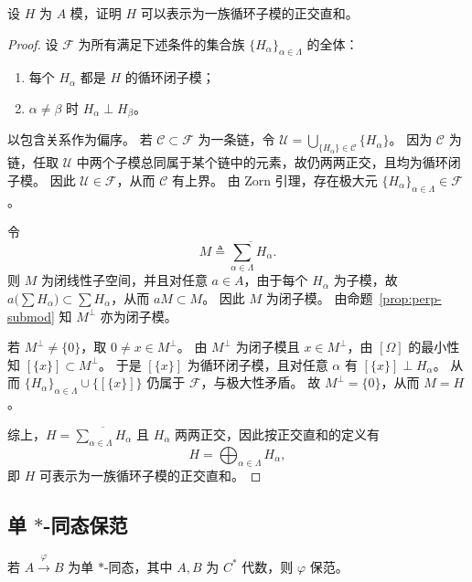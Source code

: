 \documentclass[lang=cn,a4paper,newtx,section]{elegantbook}
\begin{document}
  \begin{exercise}\label{exer:cyclic-decomp}
    设 $H$ 为 $A$ 模，证明 $H$ 可以表示为一族循环子模的正交直和。
    \begin{proof}
      设 $\mathcal{F}$ 为所有满足下述条件的集合族 $\{H_\alpha\}_{\alpha\in\Lambda}$ 的全体：
      
      \begin{enumerate}
        \item 每个 $H_\alpha$ 都是 $H$ 的循环闭子模；
        \item $\alpha\ne\beta$ 时 $H_\alpha\perp H_\beta$。
      \end{enumerate}
      以包含关系作为偏序。
      若 $\mathcal{C}\subset\mathcal{F}$ 为一条链，令 $\mathcal{U}=\bigcup_{\{H_\alpha\}\in\mathcal{C}}\{H_\alpha\}$。
      因为 $\mathcal{C}$ 为链，任取 $\mathcal{U}$ 中两个子模总同属于某个链中的元素，故仍两两正交，且均为循环闭子模。
      因此 $\mathcal{U}\in\mathcal{F}$，从而 $\mathcal{C}$ 有上界。
      由 Zorn 引理，存在极大元 $\{H_\alpha\}_{\alpha\in\Lambda}\in\mathcal{F}$。

      令
      \[
        M\triangleq \overline{\sum_{\alpha\in\Lambda} H_\alpha}.
      \]
      则 $M$ 为闭线性子空间，并且对任意 $a\in A$，由于每个 $H_\alpha$ 为子模，故 $a\bigl(\sum H_\alpha\bigr)\subset\sum H_\alpha$，从而 $aM\subset M$。
      因此 $M$ 为闭子模。
      由命题~\ref{prop:perp-submod} 知 $M^{\perp}$ 亦为闭子模。

      若 $M^{\perp}\ne\{0\}$，取 $0\ne x\in M^{\perp}$。
      由 $M^{\perp}$ 为闭子模且 $x\in M^{\perp}$，由 $[\Omega]$ 的最小性知 $[\{x\}]\subset M^{\perp}$。
      于是 $[\{x\}]$ 为循环闭子模，且对任意 $\alpha$ 有 $[\{x\}]\perp H_\alpha$。
      从而 $\{H_\alpha\}_{\alpha\in\Lambda}\cup\{[\{x\}]\}$ 仍属于 $\mathcal{F}$，与极大性矛盾。
      故 $M^{\perp}=\{0\}$，从而 $M=H$。

      综上，$H=\overline{\sum_{\alpha\in\Lambda} H_\alpha}$ 且 $H_\alpha$ 两两正交，因此按正交直和的定义有
      \[
        H=\bigoplus_{\alpha\in\Lambda} H_\alpha,
      \]
      即 $H$ 可表示为一族循环子模的正交直和。
    \end{proof}
  \end{exercise}

\subsection{单 $*$-同态保范}

\begin{theorem}
  若 $A\xrightarrow{\varphi}B$ 为单 $*$-同态，其中 $A,B$ 为 $C^{*}$ 代数，则 $\varphi$ 保范。
\end{theorem}
\end{document}

